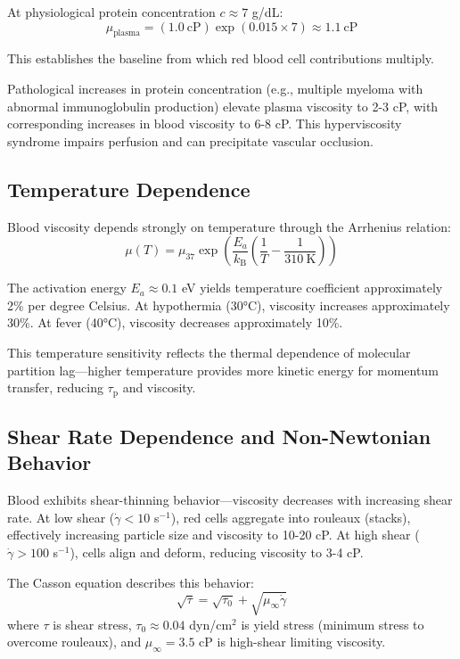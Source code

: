 \documentclass[10pt,twocolumn,a4paper]{article}
\theoremstyle{remark}
\newcommand{\kB}{k_{\mathrm{B}}}
\newcommand{\taulag}{\tau_{\mathrm{p}}}
\begin{document}
At physiological protein concentration $c \approx 7$ g/dL:
\begin{equation}
\mu_{\mathrm{plasma}} = (1.0~\mathrm{cP}) \exp(0.015 \times 7) \approx 1.1~\mathrm{cP}
\end{equation}

This establishes the baseline from which red blood cell contributions multiply.

Pathological increases in protein concentration (e.g., multiple myeloma with abnormal immunoglobulin production) elevate plasma viscosity to 2-3 cP, with corresponding increases in blood viscosity to 6-8 cP. This hyperviscosity syndrome impairs perfusion and can precipitate vascular occlusion.

\subsection{Temperature Dependence}

Blood viscosity depends strongly on temperature through the Arrhenius relation:
\begin{equation}
\mu(T) = \mu_{37} \exp\left(\frac{E_{a}}{\kB}\left(\frac{1}{T} - \frac{1}{310~\mathrm{K}}\right)\right)
\end{equation}

The activation energy $E_{a} \approx 0.1$ eV yields temperature coefficient approximately 2\% per degree Celsius. At hypothermia (30°C), viscosity increases approximately 30\%. At fever (40°C), viscosity decreases approximately 10\%.

This temperature sensitivity reflects the thermal dependence of molecular partition lag—higher temperature provides more kinetic energy for momentum transfer, reducing $\taulag$ and viscosity.

\subsection{Shear Rate Dependence and Non-Newtonian Behavior}

Blood exhibits shear-thinning behavior—viscosity decreases with increasing shear rate. At low shear ($\dot{\gamma} < 10$ s$^{-1}$), red cells aggregate into rouleaux (stacks), effectively increasing particle size and viscosity to 10-20 cP. At high shear ($\dot{\gamma} > 100$ s$^{-1}$), cells align and deform, reducing viscosity to 3-4 cP.

The Casson equation describes this behavior:
\begin{equation}
\sqrt{\tau} = \sqrt{\tau_{0}} + \sqrt{\mu_{\infty} \dot{\gamma}}
\end{equation}
where $\tau$ is shear stress, $\tau_{0} \approx 0.04$ dyn/cm$^{2}$ is yield stress (minimum stress to overcome rouleaux), and $\mu_{\infty} = 3.5$ cP is high-shear limiting viscosity.
\end{document}
